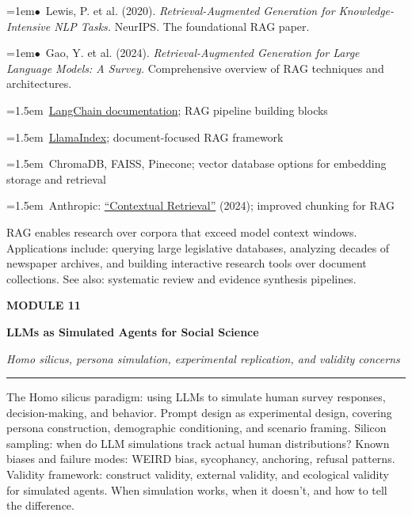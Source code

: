 \documentclass[11pt, a4paper]{article}
\newcommand{\modulehead}[3]{%
  \vspace{0.5em}
  {\small\sffamily\bfseries\textcolor{accent}{MODULE #1}}\par\vspace{-0.3em}
  {\Large\sffamily\bfseries\textcolor{dark}{#2}}\par\vspace{-0.2em}
  {\small\textit{\textcolor{muted}{#3}}}\par
  \vspace{0.2em}\textcolor{bordercol}{\rule{\textwidth}{0.3pt}}\par
}
\newcommand{\seclabel}[1]{%
  \vspace{0.6em}{\normalsize\sffamily\bfseries\textcolor{accent}{#1}}\par\vspace{0.2em}
}
\newcommand{\refpaper}[1]{%
  \par\hangindent=1em\hangafter=1\noindent\textcolor{accent}{\small$\bullet$}~{\small #1}\par
}
\newcommand{\resource}[1]{%
  \par\hangindent=1.5em\hangafter=1\noindent\hspace{0.5em}{\small\textcolor{accent}{\guilsinglright}}~{\small #1}\par
}
\begin{document}
\seclabel{Core Readings}

\refpaper{Lewis, P. et al. (2020). \textit{Retrieval-Augmented Generation for Knowledge-Intensive NLP Tasks.} NeurIPS. The foundational RAG paper.}

\refpaper{Gao, Y. et al. (2024). \textit{Retrieval-Augmented Generation for Large Language Models: A Survey.} Comprehensive overview of RAG techniques and architectures.}

\seclabel{Further Resources}

\resource{\href{https://python.langchain.com}{LangChain documentation}; RAG pipeline building blocks}

\resource{\href{https://www.llamaindex.ai}{LlamaIndex}; document-focused RAG framework}

\resource{ChromaDB, FAISS, Pinecone; vector database options for embedding storage and retrieval}

\resource{Anthropic: \href{https://www.anthropic.com/news/contextual-retrieval}{``Contextual Retrieval''} (2024); improved chunking for RAG}

\begin{appblock}
RAG enables research over corpora that exceed model context windows. Applications include: querying large legislative databases, analyzing decades of newspaper archives, and building interactive research tools over document collections. See also: systematic review and evidence synthesis pipelines.
\end{appblock}

\vspace{1.5em}

\modulehead{11}{LLMs as Simulated Agents for Social Science}{Homo silicus, persona simulation, experimental replication, and validity concerns}

\seclabel{Core Concepts}

The Homo silicus paradigm: using LLMs to simulate human survey responses, decision-making, and behavior. Prompt design as experimental design, covering persona construction, demographic conditioning, and scenario framing. Silicon sampling: when do LLM simulations track actual human distributions? Known biases and failure modes: WEIRD bias, sycophancy, anchoring, refusal patterns. Validity framework: construct validity, external validity, and ecological validity for simulated agents. When simulation works, when it doesn't, and how to tell the difference.

\seclabel{Core Readings}
\end{document}
